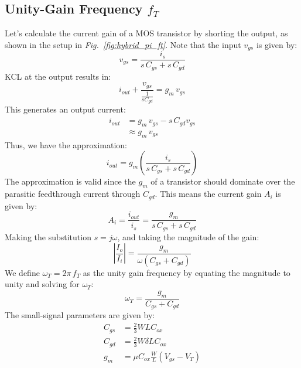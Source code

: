 \subsection{Unity-Gain Frequency \texorpdfstring{$f_T$}{}}
Let's calculate the current gain of a MOS transistor by shorting the output, as shown in the setup in \emph{Fig.~\ref{fig:hybrid_pi_ft}}.  Note that the input $v_{gs}$ is given by:
    \begin{equation}
        v_{gs} = \frac{i_s}{s\,C_{gs} + s\,C_{gd}}
    \end{equation}
KCL at the output results in:
    \begin{equation} 
        i_{out} + \frac{v_{gs}}{\frac{1}{s{C_{gd}}}} = g_m\,v_{gs} 
    \end{equation}
This generates an output current:
    \begin{align} 
        i_{out} &= g_m\,v_{gs} - s\,C_{gd}v_{gs}\\[0.35cm]
        &\approx g_m\,v_{gs}
    \end{align}
Thus, we have the approximation:
    \begin{equation} 
        i_{out} = g_m\left(\frac{i_s}{s\,C_{gs} + s\,C_{gd}}\right)
    \end{equation}
The approximation is valid since the $g_m$ of a transistor should dominate over the parasitic feedthrough current through $C_{gd}$.  This means the current gain $A_i$ is given by:
    \begin{equation} 
        A_i = \frac{i_{out}}{i_s} = \frac{g_m}{s\,C_{gs} + s\,C_{gd}}
    \end{equation}
Making the substitution $s = j\omega$, and taking the magnitude of the gain:
    \begin{equation} 
        \left|\frac{I_o}{I_i}\right| = \frac{g_m}{\omega(C_{gs} + C_{gd})}
    \end{equation}
We define $\omega_T = 2\pi\,f_T$ as the unity gain frequency by equating the magnitude to unity and solving for $\omega_T$:
    \begin{equation} 
        \omega_T = \frac{g_m}{C_{gs} + C_{gd}}
        \label{eq:ft1}
    \end{equation}
The small-signal parameters are given by:
    \begin{align}
        C_{gs} &= \frac{2}{3} W L C_{ox}\\[0.45cm]
        C_{gd} &= \frac{2}{3} W \delta L C_{ox}\\[0.45cm]
        g_m &= \mu C_{ox} \frac{W}{L} (V_{gs} - V_T)
    \end{align}
